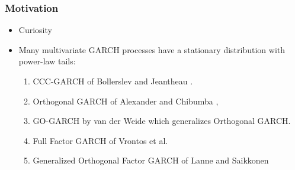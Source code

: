 \documentclass{beamer}
\begin{document}
\begin{frame}
  \frametitle{Motivation}
  \begin{itemize}
  \item Curiosity
    \item Many multivariate GARCH processes have a stationary
      distribution with power-law tails:
      \begin{enumerate}
        \item CCC-GARCH of Bollerslev \cite{bollerslev:1990} and
          Jeantheau \cite{jeantheau:1998}.
        \item Orthogonal GARCH of
          Alexander and Chibumba \cite{alexander:chibumba:1996},
        \item GO-GARCH by van der Weide \cite{Weide2002} which
          generalizes Orthogonal GARCH.
        \item Full Factor GARCH of Vrontos et
          al. \cite{vrontos2003full}
        \item Generalized Orthogonal Factor GARCH of Lanne and
          Saikkonen  \cite{lanne2007modelling}
      \end{enumerate}
  \end{itemize}
\end{frame}
\end{document}
